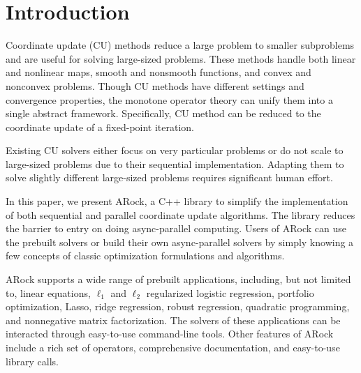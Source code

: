 \section{Introduction}
Coordinate update (CU) methods reduce a large problem to smaller subproblems and are useful for solving large-sized problems.
These methods handle both linear and nonlinear maps, smooth and nonsmooth functions, and convex and nonconvex problems. 
Though CU methods have different settings and convergence properties,  the monotone operator theory can unify them into a single abstract framework. 
Specifically, CU method can be reduced to the coordinate update of a fixed-point iteration. 

Existing CU solvers \citep{hsieh2015passcode,jaggi2014communication,recht2011hogwild} either focus on very particular problems or do not scale to large-sized problems due to their sequential implementation. 
Adapting them to solve slightly different large-sized problems requires significant human effort. 

In this paper, we present ARock, a C++ library to simplify the implementation of both sequential and parallel coordinate update algorithms. 
The library reduces the barrier to entry on doing async-parallel computing. 
Users of ARock can use the prebuilt solvers or build their own async-parallel solvers by simply knowing a few concepts of classic optimization formulations and algorithms.

ARock supports a wide range of prebuilt applications, including, but not limited to, 
linear equations, $\ell_1$ and $\ell_2$ regularized logistic regression, portfolio optimization, 
Lasso, ridge regression, robust regression, quadratic programming, and nonnegative matrix factorization. 
The solvers of these applications can be interacted through easy-to-use command-line tools. 
Other features of ARock include a rich set of operators, comprehensive documentation, and easy-to-use library calls.